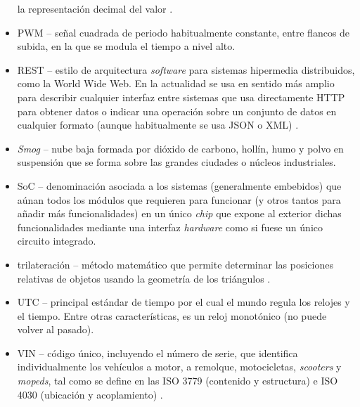 \begin{itemize}
        la representación decimal del valor \cite{OBDIIPIDs2021}.
  \item \ac{PWM} -- señal cuadrada de periodo habitualmente constante, entre flancos de
        subida, en la que se modula el tiempo a nivel alto.
  \item \ac{REST} -- estilo de arquitectura \textit{software} para sistemas hipermedia
        distribuidos, como la World Wide Web. En la actualidad se usa en sentido más
        amplio para describir cualquier interfaz entre sistemas que usa directamente
        HTTP para obtener datos o indicar una operación sobre un conjunto de datos
        en cualquier formato (aunque habitualmente se usa JSON o XML) \cite{TransferenciaEstadoRepresentacional2022}.
  \item \textit{Smog} -- nube baja formada por dióxido de carbono, hollín, humo y polvo
        en suspensión que se forma sobre las grandes ciudades o núcleos industriales.
  \item \ac{SoC} -- denominación asociada a los sistemas (generalmente embebidos) que
        aúnan todos los módulos que requieren para funcionar (y otros tantos para añadir más
        funcionalidades) en un único \textit{chip} que expone al exterior dichas
        funcionalidades mediante una interfaz \textit{hardware} como si fuese un único
        circuito integrado.
  \item trilateración -- método matemático que permite determinar las posiciones
        relativas de objetos usando la geometría de los triángulos \cite{Trilateracion2021}.
  \item \ac{UTC} -- principal estándar de tiempo por el cual el mundo regula los relojes y el tiempo.
        Entre otras características, es un reloj monotónico (no puede volver al pasado).
  \item \ac{VIN} -- código único, incluyendo el número de serie, que identifica individualmente
        los vehículos a motor, a remolque, motocicletas, \textit{scooters} y \textit{mopeds},
        tal como se define en las ISO 3779 (contenido y estructura) e ISO 4030 (ubicación
        y acoplamiento) \cite{VehicleIdentificationNumber2022}.
\end{itemize}
